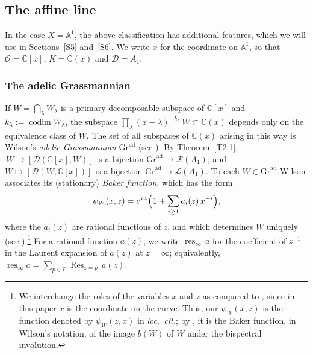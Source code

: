 \documentclass[11pt,reqno]{amsart}
\theoremstyle{plain}
\theoremstyle{definition}
\theoremstyle{remark}
\numberwithin{equation}{section}
\newcommand{\cD}{\mathcal{D}}
\newcommand{\cO}{\mathcal{O}}
\newcommand{\cL}{\mathcal{L}}
\newcommand{\cR}{\mathcal{R}}
\newcommand{\C}{\mathbb{C}}
\newcommand{\A}{\mathbb{A}}
\newcommand{\Gra}{\mathrm{Gr}^{\mathrm{ad}}}
\DeclareMathOperator{\codim}{codim}
\DeclareMathOperator{\res}{res}
\DeclareMathOperator{\Res}{Res}
\begin{document}
\subsection{The affine line}
\label{S2.6}
In the case $X = \A^1$, the above classification has additional features, which we will use in
Sections~\ref{S5} and~\ref{S6}. We write $x$ for the coordinate on $\A^1$, so that $\cO = \C[x]$,
$K = \C(x)$ and $\cD = A_1$.

\subsubsection*{The adelic Grassmannian}
If $W = \bigcap_\lambda W_\lambda$ is a primary decomposable subspace of $\C[x]$ and $k_\lambda :=
\codim W_\lambda$, the subspace $\prod_\lambda (x - \lambda)^{-k_\lambda}\, W \subset \C(x)$ depends
only on the equivalence class of $W$. The set of all subspaces of $\C(x)$ arising in this way is
Wilson's \emph{adelic Grassmannian} $\Gra$ (see \cite{Wilson1993, Wilson1998}). By
Theorem~\ref{T2.1}, $\,W \mapsto [\cD(\C[x], W)]$ is a bijection $\Gra \to \cR(A_1)$, and
$W \mapsto [\cD(W, \C[x])]$ is a bijection $\Gra \to \cL(A_1)$. To each $W \in \Gra$ Wilson
associates its (stationary) \emph{Baker function}, which has the form
\begin{equation}
\label{E213}
  \psi_W(x, z) = e^{xz} \Bigl( 1 + \sum_{i \ge 1} a_i(z)\, x^{-i} \Bigr) ,
\end{equation}
where the $a_i(z)$ are rational functions of $z$, and which determines $W$ uniquely (see
\cite[Section~4]{Wilson1993}).\footnote{We interchange the roles of the variables $x$ and $z$ as
compared to \cite{Wilson1993, Wilson1998}, since in this paper $x$ is the coordinate on the curve.
Thus, our $\psi_W(x,z)$ is the function denoted by $\psi_W(z,x)$ in \emph{loc.~cit.}; by
\cite[Theorem~2]{Wilson1993}, it is the Baker function, in Wilson's notation, of the image $b(W)$
of $W$ under the bispectral involution.} For a rational function $a(z)$, we write $\res_{\infty}\, a$ for
the coefficient of $z^{-1}$ in the Laurent expansion of $a(z)$ at $z = \infty$; equivalently,
$\res_\infty a = \sum_{p \in \C} \Res_{z = p}\, a(z)$.
\end{document}
